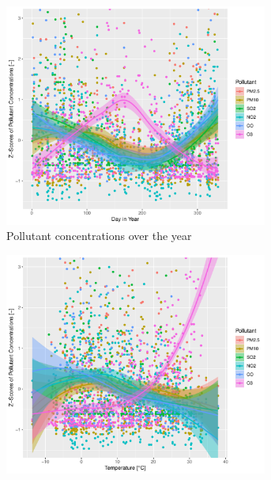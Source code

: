\documentclass[a4paper, 12pt]{article}
\begin{document}
	\begin{figure}[h]
        \begin{subfigure}{.49\textwidth}
            \centering
            \includegraphics[width=0.95\textwidth]{resources/pdf/pollutants_months.pdf}
            \caption{Pollutant concentrations over the year}
            \label{fig:pollutant_months}
            \vspace{0.5em}
        \end{subfigure}
        \begin{subfigure}{.49\textwidth}
            \centering
            \includegraphics[width=0.95\textwidth]{resources/pdf/pollutants_temp.pdf}

\end{subfigure}
\end{figure}
\end{document}
